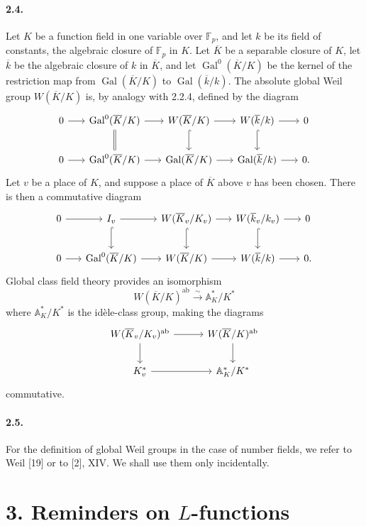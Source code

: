 \documentclass[10pt]{article}
\newcommand{\F}{\mathbb F}
\newcommand{\A}{\mathbb A}
\newcommand{\Gal}{\operatorname{Gal}}
\newcommand{\iso}{\xrightarrow{\sim}}
\providecommand{\ab}{\mathrm{ab}}
\providecommand{\ab}{\mathrm{ab}}
\begin{document}
\paragraph{2.4.} Let \(K\) be a function field in one variable over \(\F_p\), and let \(k\) be its field of constants, the algebraic closure of \(\F_p\) in \(K\). Let \(\overline K\) be a separable closure of \(K\), let \(\overline k\) be the algebraic closure of \(k\) in \(\overline K\), and let \(\Gal^0(\overline K/K)\) be the kernel of the restriction map from \(\Gal(\overline K/K)\) to \(\Gal(\overline k/k)\). The absolute global Weil group \(W(\overline K/K)\) is, by analogy with 2.2.4, defined by the diagram
\[
\begin{tikzcd}[column sep=1.7em,row sep=2.1em]
0 \arrow[r] & \Gal^0(\overline K/K) \arrow[r] \arrow[d,equal] &
W(\overline K/K) \arrow[r] \arrow[d,hook] &
W(\overline k/k) \arrow[r] \arrow[d,hook] & 0\\
0 \arrow[r] & \Gal^0(\overline K/K) \arrow[r] &
\Gal(\overline K/K) \arrow[r] &
\Gal(\overline k/k) \arrow[r] & 0 .
\end{tikzcd}
\]
Let \(v\) be a place of \(K\), and suppose a place of \(\overline K\) above \(v\) has been chosen. There is then a commutative diagram
\[
\begin{tikzcd}[column sep=1.6em,row sep=2.1em]
0 \arrow[r] & I_v \arrow[r] \arrow[d,hook] &
W(\overline K_v/K_v) \arrow[r] \arrow[d,hook] &
W(\overline k_v/k_v) \arrow[r] \arrow[d,hook] & 0\\
0 \arrow[r] & \Gal^0(\overline K/K) \arrow[r] &
W(\overline K/K) \arrow[r] &
W(\overline k/k) \arrow[r] & 0 .
\end{tikzcd}
\]
Global class field theory provides an isomorphism
\[
W(\overline K/K)^{\ab}\iso\A_K^*/K^*
\]
where \(\A_K^*/K^*\) is the idèle-class group, making the diagrams
\[
\begin{tikzcd}[column sep=3.0em,row sep=2.0em]
W(\overline K_v/K_v)^{\ab} \arrow[r] \arrow[d] &
W(\overline K/K)^{\ab} \arrow[d]\\
K_v^* \arrow[r] & \A_K^*/K^*
\end{tikzcd}
\]
commutative.

\paragraph{2.5.} For the definition of global Weil groups in the case of number fields, we refer to Weil [19] or to [2], XIV. We shall use them only incidentally.

\section*{3. Reminders on \(L\)-functions}
\end{document}
